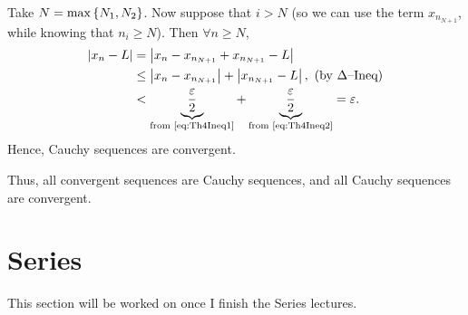 \documentclass[12pt]{article}
\theoremstyle{definition}
\renewenvironment{proof}[1][\proofname]{\vspace{-10pt}\begin{replacementproof}}{\end{replacementproof}}
\begin{document}
\begin{proof}
        Take $N = \max\left\{N_{1}, N_{2}\right\}$. Now suppose that $i > N$ (so we can use the term $x_{n_{N + 1}}$, while knowing that $n_{i} \geq N$). 
        Then $\forall n \geq N$,
        \begin{align*}
            \left|x_{n} - L\right| &= \left|x_{n} - x_{n_{N + 1}} + x_{n_{N + 1}} - L\right| \\
                            &\leq \left|x_{n} - x_{n_{N + 1}}\right| + \left|x_{n_{N + 1}} - L\right|, ~ \text{(by $\Delta$--Ineq)} \\
                            &< \underbrace{\frac{\varepsilon}{2}}_{\text{from \eqref{eq:Th4Ineq1}}} + \underbrace{\frac{\varepsilon}{2}}_{\text{from \eqref{eq:Th4Ineq2}}} = \varepsilon.
        \end{align*} 
        Hence, Cauchy sequences are convergent. 

        Thus, all convergent sequences are Cauchy sequences, and all Cauchy sequences are convergent.
    \end{proof}
    \section{Series}
    This section will be worked on once I finish the Series lectures. 
\end{document}

